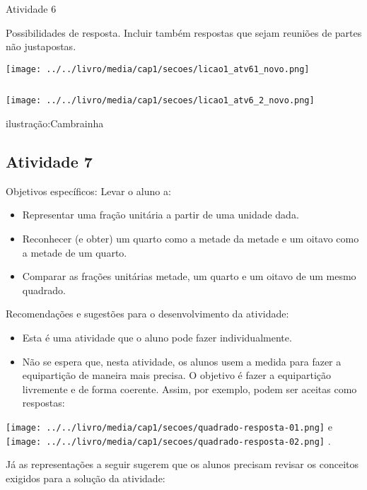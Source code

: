 \documentclass[oneside]{book}
\begin{document}
\begin{multicols}{2}
\begin{resposta*}{Atividade 6}

  Possibilidades de resposta. Incluir também respostas que sejam reuniões de partes não justapostas.

    \texttt{[image: ../../livro/media/cap1/secoes/licao1\_atv61\_novo.png]}

  $\ $

    \texttt{[image: ../../livro/media/cap1/secoes/licao1\_atv6\_2\_novo.png]}

  ilustração:Cambrainha
\end{resposta*}



\subsection{Atividade 7}

  Objetivos específicos: Levar o aluno a:
\begin{itemize} %
    \item       Representar uma fração unitária a partir de uma unidade dada.
    \item       Reconhecer (e obter) um quarto como a metade da metade e um oitavo como a metade de um quarto.
    \item       Comparar as frações unitárias metade, um quarto e um oitavo de um mesmo quadrado.
\end{itemize} %


  Recomendações e sugestões para o desenvolvimento da atividade:
\begin{itemize} %
    \item       Esta é uma atividade que o aluno pode fazer individualmente.
    \item       Não se espera que, nesta atividade, os alunos usem a medida para fazer a equipartição de maneira mais precisa. O objetivo é fazer a equipartição livremente e de forma coerente. Assim, por exemplo, podem ser aceitas como respostas:
\end{itemize} %


    \texttt{[image: ../../livro/media/cap1/secoes/quadrado-resposta-01.png]}   e     \texttt{[image: ../../livro/media/cap1/secoes/quadrado-resposta-02.png]}  .

  Já as representações a seguir sugerem que os alunos precisam revisar os conceitos exigidos para a solução da atividade:


\end{multicols}
\end{document}
